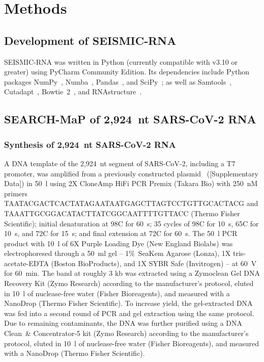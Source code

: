 \documentclass[main.tex]{subfiles}
\begin{document}
\section{Methods}
\label{methods}


\subsection{Development of SEISMIC-RNA}

SEISMIC-RNA was written in Python (currently compatible with v3.10 or greater) using PyCharm Community Edition.
Its dependencies include Python packages NumPy~\cite{Harris2020}, Numba~\cite{Lam2015}, Pandas~\cite{McKinney2010,Reback2020}, and SciPy~\cite{Virtanen2020}; as well as Samtools~\cite{Li2009}, Cutadapt~\cite{Martin2011}, Bowtie~2~\cite{Langmead2012}, and RNAstructure~\cite{Reuter2010}.


\subsection{SEARCH-MaP of 2,924~nt SARS-CoV-2 RNA}

\subsubsection{Synthesis of 2,924~nt SARS-CoV-2 RNA}

A DNA template of the 2,924~nt segment of SARS-CoV-2, including a T7 promoter, was amplified from a previously constructed plasmid~\cite{Lan2022} ([Supplementary Data]) in 50~\textmu l using 2X CloneAmp HiFi PCR Premix (Takara Bio) with 250~nM primers TAATACGACTCACTATAGAATAATGAGCTTAGTCCTGTTGCACTACG and TAAATTGCGGACATACTTATCGGCAATTTTGTTACC (Thermo Fisher Scientific); initial denaturation at 98\textdegree C for 60~s; 35 cycles of 98\textdegree C for 10~s, 65\textdegree C for 10~s, and 72\textdegree C for 15~s; and final extension at 72\textdegree C for 60~s.
The 50~\textmu l PCR product with 10~\textmu l of 6X Purple Loading Dye (New England Biolabs) was electrophoresed through a 50~ml gel -- 1\%~SeaKem Agarose (Lonza), 1X tris-acetate-EDTA (Boston BioProducts), and 1X SYBR Safe (Invitrogen) -- at 60~V for 60~min.
The band at roughly 3 kb was extracted using a Zymoclean Gel DNA Recovery Kit (Zymo Research) according to the manufacturer's protocol, eluted in 10~\textmu l of nuclease-free water (Fisher Bioreagents), and measured with a NanoDrop (Thermo Fisher Scientific).
To increase yield, the gel-extracted DNA was fed into a second round of PCR and gel extraction using the same protocol.
Due to remaining contaminants, the DNA was further purified using a DNA Clean~\& Concentrator-5 kit (Zymo Research) according to the manufacturer's protocol, eluted in 10~\textmu l of nuclease-free water (Fisher Bioreagents), and measured with a NanoDrop (Thermo Fisher Scientific).
\end{document}
